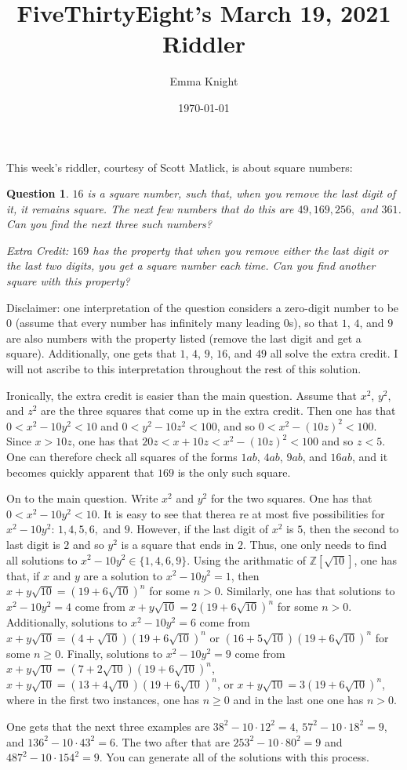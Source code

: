 \documentclass[11pt]{article}
\title{FiveThirtyEight's March 19, 2021 Riddler}
\author{Emma Knight}
\date{\today}
\newtheorem{question}[theorem]{Question}
\theoremstyle{definition}
\newcommand{\Z}{\mathbb{Z}}
\begin{document}
\maketitle
This week's riddler, courtesy of Scott Matlick, is about square numbers:
\begin{question}
$16$ is a square number, such that, when you remove the last digit of it, it remains square.  The next few numbers that do this are $49, 169, 256,$ and $361$.  Can you find the next three such numbers?

\emph{Extra Credit}: $169$ has the property that when you remove either the last digit or the last two digits, you get a square number each time.  Can you find another square with this property?
\end{question}
Disclaimer: one interpretation of the question considers a zero-digit number to be $0$ (assume that every number has infinitely many leading $0$s), so that $1$, $4$, and $9$ are also numbers with the property listed (remove the last digit and get a square).  Additionally, one gets that $1$, $4$, $9$, $16$, and $49$ all solve the extra credit.  I will not ascribe to this interpretation throughout the rest of this solution.

Ironically, the extra credit is easier than the main question.  Assume that $x^2$, $y^2$, and $z^2$ are the three squares that come up in the extra credit.  Then one has that $0 < x^2 - 10y^2 < 10$ and $0 < y^2 - 10z^2 < 100$, and so $0 < x^2 - (10z)^2 < 100$.  Since $x > 10z$, one has that $20z < x + 10z < x^2-(10z)^2 < 100$ and so $z < 5$.  One can therefore check all squares of the forms $1ab$, $4ab$, $9ab$, and $16ab$, and it becomes quickly apparent that $169$ is the only such square.

On to the main question.  Write $x^2$ and $y^2$ for the two squares.  One has that $0 < x^2-10y^2 < 10$.  It is easy to see that therea re at most five possibilities for $x^2-10y^2$: $1, 4, 5, 6,$ and $9$.  However, if the last digit of $x^2$ is $5$, then the second to last digit is $2$ and so $y^2$ is a square that ends in $2$.  Thus, one only needs to find all solutions to $x^2-10y^2 \in \{1, 4, 6, 9\}$.  Using the arithmatic of $\Z[\sqrt{10}]$, one has that, if $x$ and $y$ are a solution to $x^2-10y^2 = 1$, then $x+y\sqrt{10} = (19+6\sqrt{10})^n$ for some $n > 0$.  Similarly, one has that solutions to $x^2 - 10y^2 = 4$ come from $x+y\sqrt{10} = 2(19+6\sqrt{10})^n$ for some $n > 0$.  Additionally, solutions to $x^2 - 10y^2 = 6$ come from $x+y \sqrt{10} = (4+\sqrt{10})(19+6\sqrt{10})^n$ or $(16+5\sqrt{10})(19+6\sqrt{10})^n$ for some $n \geq 0$.  Finally, solutions to $x^2 - 10y^2 = 9$ come from $x+y \sqrt{10} = (7+2\sqrt{10})(19+6\sqrt{10})^n$, $x+y \sqrt{10} = (13+4\sqrt{10})(19+6\sqrt{10})^n$, or $x+y \sqrt{10} = 3(19+6\sqrt{10})^n$, where in the first two instances, one has $n \geq 0$ and in the last one one has $n > 0$.

One gets that the next three examples are $38^2 -10\cdot 12^2 = 4$, $57^2 - 10 \cdot 18^2 = 9$, and $136^2 - 10 \cdot 43^2 = 6$.  The two after that are $253^2 - 10\cdot 80^2 = 9$ and $487^2 - 10\cdot 154^2 = 9$.  You can generate all of the solutions with this process.
\end{document}
